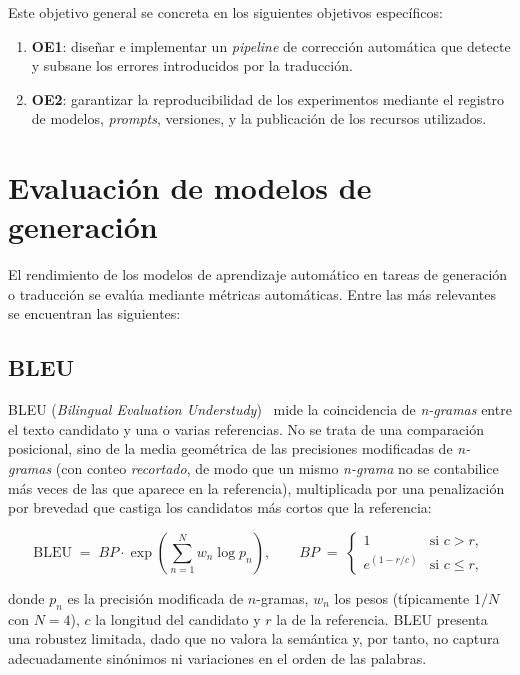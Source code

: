 Este objetivo general se concreta en los siguientes objetivos específicos:

\begin{enumerate}
	\item \textbf{OE1}: diseñar e implementar un \textit{pipeline} de corrección
	      automática que detecte y subsane los errores introducidos por la traducción.
	\item \textbf{OE2}: garantizar la reproducibilidad de los experimentos mediante
          el registro de modelos, \textit{prompts}, versiones, y la publicación de los
	      recursos utilizados.
\end{enumerate}

\section{Evaluación de modelos de generación}

El rendimiento de los modelos de aprendizaje automático en tareas de generación
o traducción se evalúa mediante métricas automáticas. Entre las más relevantes
se encuentran las siguientes:

\subsection{BLEU}

BLEU (\textit{Bilingual Evaluation Understudy})~\cite{Papineni2002} mide la
coincidencia de \textit{n-gramas} entre el texto candidato y una o varias
referencias. No se trata de una comparación posicional, sino de la media
geométrica de las precisiones modificadas de \textit{n-gramas} (con conteo
\textit{recortado}, de modo que un mismo \textit{n-grama} no se contabilice más
veces de las que aparece en la referencia), multiplicada por una penalización
por brevedad que castiga los candidatos más cortos que la referencia:

\[
	\text{BLEU} \;=\; BP \cdot \exp\!\left(\sum_{n=1}^{N} w_n \log p_n\right),
	\qquad
	BP \;=\;
	\begin{cases}
		1             & \text{si } c > r,   \\[2pt]
		e^{(1 - r/c)} & \text{si } c \le r,
	\end{cases}
\]

donde $p_n$ es la precisión modificada de $n$-gramas, $w_n$ los pesos
(típicamente $1/N$ con $N=4$), $c$ la longitud del candidato y $r$ la de la
referencia. BLEU presenta una robustez limitada, dado que no valora la
semántica y, por tanto, no captura adecuadamente sinónimos ni variaciones en el
orden de las palabras.

